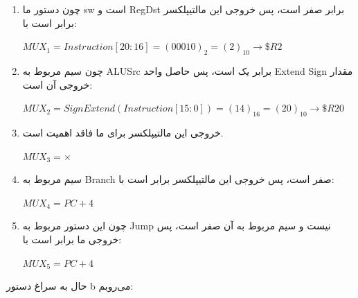 \setRTL

\begin{enumerate}
	\item 
	چون دستور ما sw است و RegDst برابر صفر است، پس خروجی این مالتیپلکسر برابر است با:
	\setLTR
	
	$MUX_1 = Instruction[20:16]=(00010)_2 = (2)_{10} \rightarrow \$R2$
	
	\setRTL
	
	\item 
چون سیم مربوط به ALUSrc برابر یک است، پس حاصل واحد Extend Sign مقدار خروجی آن است:
\setLTR

$MUX_2 = SignExtend(Instruction[15:0])= (14)_{16} = (20)_{10} \rightarrow \$R20$

\setRTL

	\item 
خروجی این مالتیپلکسر برای ما فاقد اهمیت است.

\setLTR

$MUX_3 = \times$

\setRTL

	\item 
سیم مربوط به Branch صفر است، پس خروجی این مالتیپلکسر برابر است با:
\setLTR

$MUX_4 = PC +4$

\setRTL

	\item 
چون این دستور مربوط به Jump نیست و سیم مربوط به آن صفر است، پس خروجی ما برابر است با:
\setLTR

$MUX_5 = PC +4$

\setRTL
	\end{enumerate}

حال به سراغ دستور b می‌روبم:

